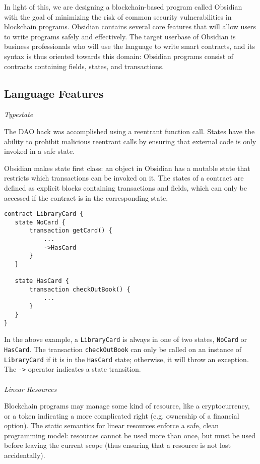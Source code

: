 \documentclass[sigplan,10pt,review,anonymous]{acmart}\settopmatter{printfolios=true}
\begin{document}
In light of this, we are designing a blockchain-based program called Obsidian \cite{Coblenz} with the goal of 
minimizing the risk of common security vulnerabilities in blockchain programs. Obsidian contains 
several core features that will allow users to write programs safely and effectively. The target 
userbase of Obsidian is business professionals who will use the language to write smart contracts, 
and its syntax is thus oriented towards this domain: Obsidian programs consist of contracts 
containing fields, states, and transactions.

\subsection{Language Features}

\textit{Typestate}

The DAO hack was accomplished using a reentrant function call. States have the ability to 
prohibit malicious reentrant calls by ensuring that external code is only invoked in a safe state. 

Obsidian makes state first class: an object in Obsidian has a mutable state that restricts which 
transactions can be invoked on it. The states of a contract are defined as explicit blocks containing 
transactions and fields, which can only be accessed if the contract is in the corresponding state. 

\begin{lstlisting}[caption={An example of states in Obsidian.},captionpos=b]
contract LibraryCard {
   state NoCard {
       transaction getCard() {
           ...
           ->HasCard
       }
   }
  
   state HasCard {
       transaction checkOutBook() {
           ...
       }
   }
}
\end{lstlisting}

In the above example,  a \texttt{\small{LibraryCard}} is always in one of two
states, \texttt{\small{NoCard}} or \texttt{\small{HasCard}}. The transaction 
\texttt{\small{checkOutBook}} can only be called on an instance of 
\texttt{\small{LibraryCard}} if it is in the \texttt{\small{HasCard}} state; otherwise, it will throw an exception. 
The \texttt{\small{->}} operator indicates a state transition.
\\
\\
\textit{Linear Resources}

Blockchain programs may manage some kind of resource, like a cryptocurrency, or a token 
indicating a more complicated right (e.g. ownership of a financial option). The static semantics for linear resources 
enforce a safe, clean programming model: resources cannot be used more than once, but must be 
used before leaving the current scope (thus ensuring that a resource is not lost accidentally). 
\end{document}
